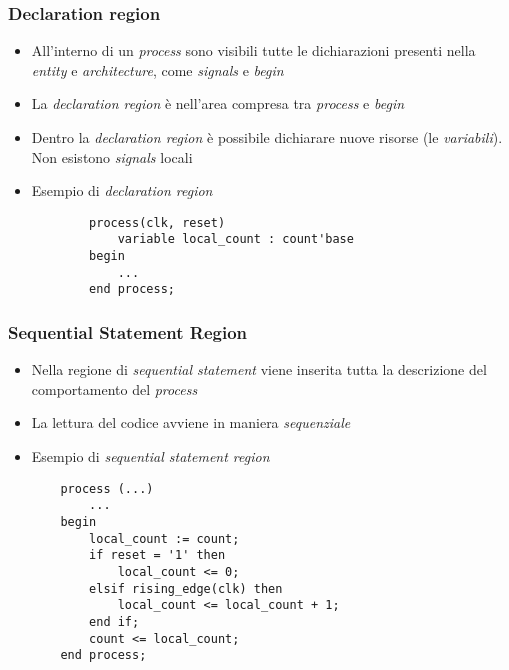 \documentclass{article}
\begin{document}
\subsubsection{Declaration region}
\begin{itemize}
  \item All'interno di un \textit{process} sono visibili tutte le dichiarazioni presenti nella \textit{entity} e \textit{architecture}, come \textit{signals} e \textit{begin}
  \item La \textit{declaration region} è nell'area compresa tra \textit{process} e \textit{begin}
  \item Dentro la \textit{declaration region} è possibile dichiarare nuove risorse (le \textit{variabili}). Non esistono \textit{signals} locali
  \item Esempio di \textit{declaration region}
        \begin{verbatim}
	    process(clk, reset)
	        variable local_count : count'base
	    begin
        	...
	    end process;
	      \end{verbatim}
\end{itemize}
\subsubsection{Sequential Statement Region}
\begin{itemize}
  \item Nella regione di \textit{sequential statement} viene inserita tutta la descrizione del comportamento del \textit{process}
  \item La lettura del codice avviene in maniera \textit{sequenziale}

        \newpage

  \item Esempio di \textit{sequential statement region}
        \begin{verbatim}
    process (...)
        ...
    begin
        local_count := count;
        if reset = '1' then
            local_count <= 0;
        elsif rising_edge(clk) then
            local_count <= local_count + 1;
        end if;
        count <= local_count;
    end process;
	      \end{verbatim}
\end{itemize}
\end{document}
